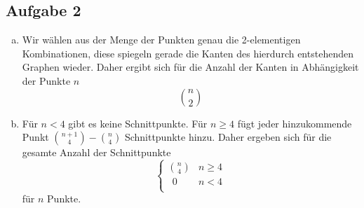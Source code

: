 \subsection*{Aufgabe 2}
\begin{enumerate}[a)]
\item  Wir wählen aus der Menge der Punkten genau die 2-elementigen Kombinationen, diese spiegeln gerade die Kanten des hierdurch entstehenden Graphen wieder. Daher ergibt sich für die Anzahl der Kanten in Abhängigkeit der Punkte $n$ \[\binom{n}{2}\]
\item
Für $n<4$ gibt es keine Schnittpunkte. Für $n \geq 4$ fügt jeder hinzukommende Punkt $  \binom{n+1}{4} - \binom{n}{4} $ Schnittpunkte hinzu. Daher ergeben sich für die gesamte Anzahl der Schnittpunkte \[\begin{cases} \binom{n}{4} & n\geq 4 \\
              \; \, 0 & n < 4  \\
              \end{cases} \] für $n$ Punkte.

\end{enumerate}

\newpage
